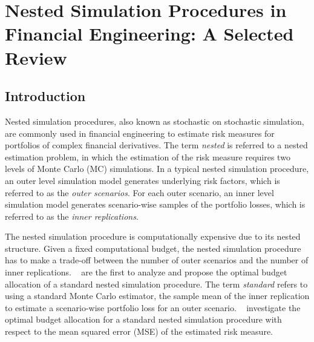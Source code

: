 \chapter{Nested Simulation Procedures in Financial Engineering: A Selected Review}

\section{Introduction}

Nested simulation procedures, also known as stochastic on stochastic simulation, are commonly used in financial engineering to estimate risk measures for portfolios of complex financial derivatives. 
The term \textit{nested} is referred to a nested estimation problem, in which the estimation of the risk measure requires two levels of Monte Carlo (MC) simulations.
In a typical nested simulation procedure, an outer level simulation model generates underlying risk factors, which is referred to as the \textit{outer scenarios}.
For each outer scenario, an inner level simulation model generates scenario-wise samples of the portfolio losses, which is referred to as the \textit{inner replications}.

The nested simulation procedure is computationally expensive due to its nested structure. 
Given a fixed computational budget, the nested simulation procedure has to make a trade-off between the number of outer scenarios and the number of inner replications.
~\cite{gordy2010nested} are the first to analyze and propose the optimal budget allocation of a standard nested simulation procedure. 
The term \textit{standard} refers to using a standard Monte Carlo estimator, the sample mean of the inner replication to estimate a scenario-wise portfolio loss for an outer scenario.
~\cite{gordy2010nested} investigate the optimal budget allocation for a standard nested simulation procedure with respect to the mean squared error (MSE) of the estimated risk measure.

